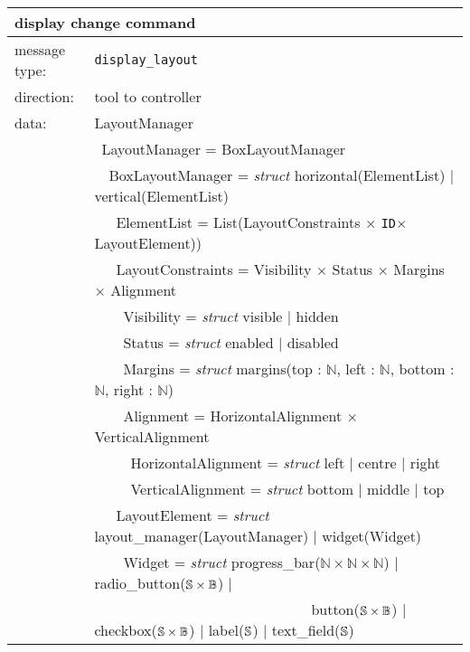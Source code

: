 \documentclass{article}
\newcommand{\msg}[1]{\texttt{#1}}
\newcommand{\String}{\ensuremath \mathbb{S}\xspace}
\newcommand{\Id}{\texttt{ID}\xspace}
\begin{document}
   \begin{table}[H]
    \begin{center}
     \begin{tabular}{|ll|}
      \hline
       \multicolumn{2}{|l|}{\textbf{display change command}} \\
      \hline
       message type:   & \msg{display\_layout} \\
      \hline
       direction:      & tool to controller \\
      \hline
       data:           & LayoutManager \\
                       & \ LayoutManager = BoxLayoutManager \\
                       & \ \ BoxLayoutManager = \textit{struct} horizontal(ElementList) $|$ vertical(ElementList) \\
                       & \ \ \ ElementList = List(LayoutConstraints $\times$ \Id $\times$ LayoutElement)) \\
                       & \ \ \ LayoutConstraints = Visibility $\times$ Status $\times$ Margins $\times$ Alignment \\
                       & \ \ \ \ Visibility = \textit{struct} visible $|$ hidden \\
                       & \ \ \ \ Status = \textit{struct} enabled $|$ disabled \\
                       & \ \ \ \ Margins = \textit{struct} margins(top : $\mathbb{N}$, left : $\mathbb{N}$, bottom : $\mathbb{N}$, right : $\mathbb{N}$) \\
                       & \ \ \ \ Alignment = HorizontalAlignment $\times$ VerticalAlignment \\
                       & \ \ \ \ \ HorizontalAlignment = \textit{struct} left $|$ centre $|$ right \\
                       & \ \ \ \ \ VerticalAlignment = \textit{struct} bottom $|$ middle $|$ top \\
                       & \ \ \ LayoutElement = \textit{struct} layout\_manager(LayoutManager) $|$ widget(Widget) \\
                       & \ \ \ \ Widget = \textit{struct} progress\_bar($\mathbb{N} \times \mathbb{N} \times \mathbb{N}$) $|$
                                                          radio\_button($\String \times \mathbb{B}$) $|$ \\
                       & \ \ \ \ \ \ \ \ \ \ \ \ \ \ \ \ \ \ \ \ \ \ \ \ \ \ \ \ \ \
                                                          button($\String \times \mathbb{B}$) $|$
                                                          checkbox($\String \times \mathbb{B}$) $|$
                                                          label($\String$) $|$
                                                          text\_field($\String$) \\
      \hline
     \end{tabular}
    \end{center}
   \vspace{-0.4cm}
   \end{table}
\end{document}
